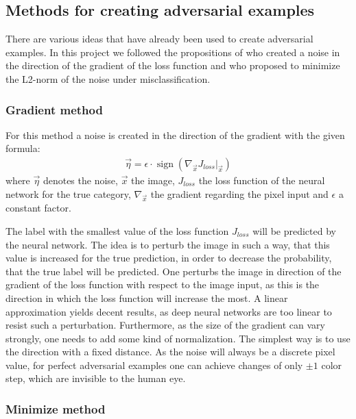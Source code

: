 \documentclass[%
 reprint,
 amsmath,amssymb,
 aps,
]{revtex4-1}
\begin{document}
\subsection{Methods for creating adversarial examples}

There are various ideas that have already been used to create adversarial examples. In this project we followed the propositions of \citet{paperGrad} who created a noise in the direction of the gradient of the loss function and \citet{paperMinimize} who proposed to minimize the L2-norm of the noise under misclassification.
\subsubsection*{Gradient method}

For this method a noise is created in the direction of the gradient with the given formula:
\begin{align*}
\vec{\eta} = \epsilon \cdot \operatorname{sign} \left( \nabla_{\vec{x}} J_{loss} \big \vert_{\vec{x}} \right)
\end{align*}
where $\vec{\eta}$ denotes the noise, $\vec{x}$ the image, $J_{loss}$ the loss function of the neural network for the true category,  $\nabla_{\vec{x}}$ the gradient regarding the pixel input and $\epsilon$ a constant factor.

The label with the smallest value of the loss function $J_{loss}$ will be predicted by the neural network. The idea is to perturb the image in such a way, that this value is increased for the true prediction, in order to decrease the probability, that the true label will be predicted. One perturbs the image in direction of the gradient of the loss function with respect to the image input, as this is the direction in which the loss function will increase the most. A linear approximation yields decent results, as deep neural networks are too linear to resist such a perturbation. Furthermore, as the size of the gradient can vary strongly, one needs to add some kind of normalization. The simplest way is to use the direction with a fixed distance. As the noise will always be a discrete pixel value, for perfect adversarial examples one can achieve changes of only $\pm 1$ color step, which are invisible to the human eye. \cite{paperGrad}

\subsubsection*{Minimize method}
\end{document}
